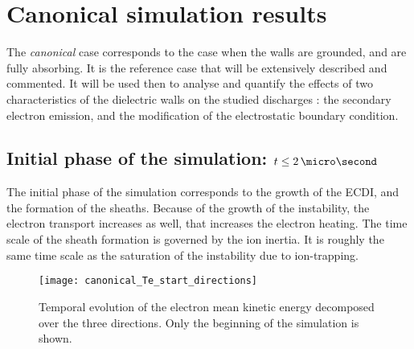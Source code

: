 
\section{Canonical simulation results}
  \label{sec-canonical}
  
  
  The {\it canonical} case corresponds to the case when the walls are grounded, and are fully absorbing. 
  It is the reference case that will be extensively described and commented.
  It will be used then to analyse and quantify the effects of two characteristics of the dielectric walls on the studied discharges : the secondary electron emission, and the modification of the electrostatic boundary condition.
  
  \subsection{Initial phase of the simulation: $t \leq 2\,\micro\second$} \label{subsec-initlaphase}
  
  The initial phase of the simulation corresponds to the growth of the \ac{ECDI}, and the formation of the sheaths.
  Because of the growth of the instability, the electron transport increases as well, that increases the electron heating.
  The time scale of the sheath formation is governed by the ion inertia.
  It is roughly the same time scale as the saturation of the instability due to ion-trapping.
  
  \begin{figure}[hbtp]
    \centering
    \texttt{[image: canonical\_Te\_start\_directions]}
    \caption{Temporal evolution of the electron mean kinetic energy decomposed over the three directions. Only the beginning of the simulation is shown.}
    \label{fig-canon_Te_strat}
  \end{figure}
  
